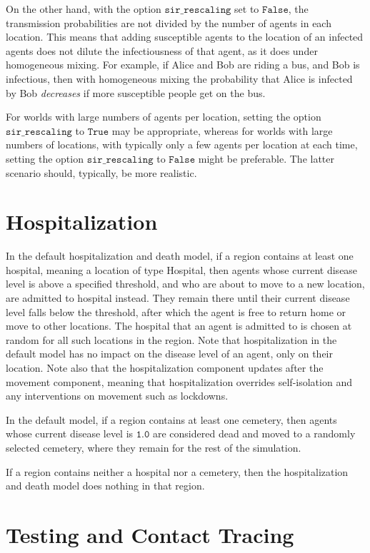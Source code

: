 \documentclass[10pt,letterpaper]{article}
\begin{document}
On the other hand, with the option $\texttt{sir{\_}rescaling}$ set to $\texttt{False}$, the transmission probabilities are not divided by the number of agents in each location. This means that adding susceptible agents to the location of an infected agents does not dilute the infectiousness of that agent, as it does under homogeneous mixing. For example, if Alice and Bob are riding a bus, and Bob is infectious, then with homogeneous mixing the probability that Alice is infected by Bob \textit{decreases} if more susceptible people get on the bus.

For worlds with large numbers of agents per location, setting the option $\texttt{sir{\_}rescaling}$ to $\texttt{True}$ may be appropriate, whereas for worlds with large numbers of locations, with typically only a few agents per location at each time, setting the option $\texttt{sir{\_}rescaling}$ to $\texttt{False}$ might be preferable. The latter scenario should, typically, be more realistic.

\section{Hospitalization}

In the default hospitalization and death model, if a region contains at least one hospital, meaning a location of type Hospital, then agents whose current disease level is above a specified threshold, and who are about to move to a new location, are admitted to hospital instead. They remain there until their current disease level falls below the threshold, after which the agent is free to return home or move to other locations. The hospital that an agent is admitted to is chosen at random for all such locations in the region. Note that hospitalization in the default model has no impact on the disease level of an agent, only on their location. Note also that the hospitalization component updates after the movement component, meaning that hospitalization overrides self-isolation and any interventions on movement such as lockdowns.

In the default model, if a region contains at least one cemetery, then agents whose current disease level is $\texttt{1.0}$ are considered dead and moved to a randomly selected cemetery, where they remain for the rest of the simulation.

If a region contains neither a hospital nor a cemetery, then the hospitalization and death model does nothing in that region.

\section{Testing and Contact Tracing}
\end{document}
